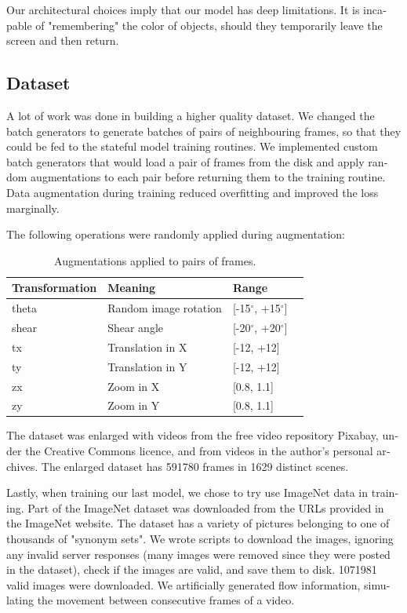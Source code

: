 \documentclass[12pt,openright,twoside,a4paper,english]{abntex2}
\begin{document}
\begin{otherlanguage}{english}
Our architectural choices imply that our model has deep limitations. It is incapable of "remembering" the color of objects, should they temporarily leave the screen and then return.

\subsection{Dataset}

A lot of work was done in building a higher quality dataset. We changed the batch generators to generate batches of pairs of neighbouring frames, so that they could be fed to the stateful model training routines. We implemented custom batch generators that would load a pair of frames from the disk and apply random augmentations to each pair before returning them to the training routine. Data augmentation during training reduced overfitting and improved the loss marginally.

The following operations were randomly applied during augmentation:

\begin{table}[H]
    \centering
    \begin{tabular}{llll}
    Transformation & Meaning               & Range          &  \\ \hline
    theta          & Random image rotation & [-15$^{\circ}$, +15$^{\circ}$]   &  \\
    shear          & Shear angle           & [-20$^{\circ}$, +20$^{\circ}$] &  \\ \hline
    tx             & Translation in X      & [-12, +12]       &  \\
    ty             & Translation in Y      & [-12, +12]       &  \\ \hline
    zx             & Zoom in X             & [0.8, 1.1]       &  \\
    zy             & Zoom in Y             & [0.8, 1.1]       &  \\ \hline
    \end{tabular}
    \label{table:augmentations}
    \caption{Augmentations applied to pairs of frames.}
\end{table}

The dataset was enlarged with videos from the free video repository Pixabay, under the Creative Commons licence, and from videos in the author's personal archives. The enlarged dataset has 591780 frames in 1629 distinct scenes.

Lastly, when training our last model, we chose to try use ImageNet \cite{imagenet_cvpr09} data in training. Part of the ImageNet dataset was downloaded from the URLs provided in the ImageNet website. The dataset has a variety of pictures belonging to one of thousands of "synonym sets". We wrote scripts to download the images, ignoring any invalid server responses (many images were removed since they were posted in the dataset), check if the images are valid, and save them to disk. 1071981 valid images were downloaded.  We artificially generated flow information, simulating the movement between consecutive frames of a video.


\end{otherlanguage}
\end{document}
